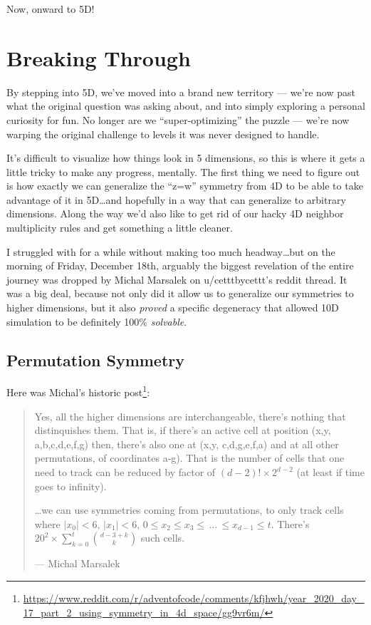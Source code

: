 \documentclass[]{article}
\renewcommand{\href}[2]{#2\footnote{\url{#1}}}
\begin{document}
Now, onward to 5D!

\hypertarget{breaking-through}{%
\section{Breaking Through}\label{breaking-through}}

By stepping into 5D, we've moved into a brand new territory --- we're now past
what the original question was asking about, and into simply exploring a
personal curiosity for fun. No longer are we ``super-optimizing'' the puzzle ---
we're now warping the original challenge to levels it was never designed to
handle.

It's difficult to visualize how things look in 5 dimensions, so this is where it
gets a little tricky to make any progress, mentally. The first thing we need to
figure out is how exactly we can generalize the ``z=w'' symmetry from 4D to be
able to take advantage of it in 5D\ldots and hopefully in a way that can
generalize to arbitrary dimensions. Along the way we'd also like to get rid of
our hacky 4D neighbor multiplicity rules and get something a little cleaner.

I struggled with for a while without making too much headway\ldots but on the
morning of Friday, December 18th, arguably the biggest revelation of the entire
journey was dropped by Michal Marsalek on u/cetttbycettt's reddit thread. It was
a big deal, because not only did it allow us to generalize our symmetries to
higher dimensions, but it also \emph{proved} a specific degeneracy that allowed
10D simulation to be definitely 100\% \emph{solvable}.

\hypertarget{permutation-symmetry}{%
\subsection{Permutation Symmetry}\label{permutation-symmetry}}

Here was Michal's
\href{https://www.reddit.com/r/adventofcode/comments/kfjhwh/year_2020_day_17_part_2_using_symmetry_in_4d_space/gg9vr6m/}{historic
post}:

\begin{quote}
Yes, all the higher dimensions are interchangeable, there's nothing that
distinquishes them. That is, if there's an active cell at position (x,y,
a,b,c,d,e,f,g) then, there's also one at (x,y, c,d,g,e,f,a) and at all other
permutations, of coordinates a-g). That is the number of cells that one need to
track can be reduced by factor of \((d-2)! \times 2^{d-2}\) (at least if time
goes to infinity).

\ldots we can use symmetries coming from permutations, to only track cells where
\(|x_0| < 6,\, |x_1| < 6,\, 0 \leq x_2 \leq x_3 \leq\,\ldots\, \leq x_{d-1} \leq t\).
There's \(20^2 \times \sum_{k=0}^{t} { {d-3+k} \choose {k} }\) such cells.

--- Michal Marsalek
\end{quote}
\end{document}
